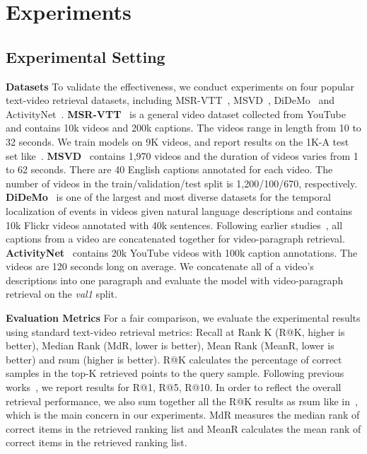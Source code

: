 \documentclass[sigconf]{acmart}
\begin{document}
\section{Experiments}\label{sec:exp}
\subsection{Experimental Setting}\label{subsec:exp_setting}
\textbf{Datasets}
To validate the effectiveness, we conduct experiments on four popular text-video retrieval datasets, including MSR-VTT~\cite{msrvtt2016}, MSVD~\cite{msvd2011}, DiDeMo~\cite{didemo2017} and ActivityNet~\cite{activitynet2015}.
\textbf{MSR-VTT}~\cite{msrvtt2016} is a general video dataset collected from YouTube and contains 10k videos and 200k captions. The videos range in length from 10 to 32 seconds. We train models on 9K videos, and report results on the 1K-A test set like~\cite{ts2net2022,xclip2022,drl2022}. 
\textbf{MSVD}~\cite{msvd2011} contains 1,970 videos and the duration of videos varies from 1 to 62 seconds. There are 40 English captions annotated for each video. The number of videos in the train/validation/test split is 1,200/100/670, respectively.
\textbf{DiDeMo}~\cite{didemo2017} is one of the largest and most diverse datasets for the temporal localization of events in videos given natural language descriptions and contains 10k Flickr videos annotated with 40k sentences. Following earlier studies~\cite{clip4clip2021,ts2net2022,xclip2022}, all captions from a video are concatenated together for video-paragraph retrieval.
\textbf{ActivityNet}~\cite{activitynet2015} contains 20k YouTube videos with 100k caption annotations. 
The videos are 120 seconds long on average. 
We concatenate all of a video's descriptions into one paragraph and evaluate the model with video-paragraph retrieval on the \textit{val1} split.





\textbf{Evaluation Metrics}
For a fair comparison, we evaluate the experimental results using standard text-video retrieval metrics: Recall at Rank K (R@K, higher is better), Median Rank (MdR, lower is better), Mean Rank (MeanR, lower is better) and rsum (higher is better). R@K calculates the percentage of correct samples in the top-K retrieved points to the query sample. 
Following previous works~\cite{clip2tv2021,ts2net2022,xclip2022}, we report results for R@1, R@5, R@10. In order to reflect the overall retrieval performance, we also sum together all the R@K results as rsum like in~\cite{Chen2020FineGrainedVR,Dong2021DualEF,hanet2021,ts2net2022}, which is the main concern in our experiments.
MdR measures the median rank of correct items in the retrieved ranking list and MeanR calculates the mean rank of correct items in the retrieved ranking list. 
\end{document}
